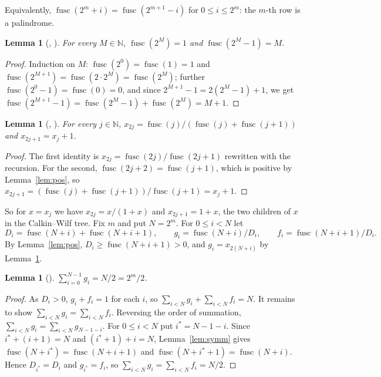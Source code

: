 \documentclass[11pt]{amsart}
\theoremstyle{plain}
\newtheorem{lemma}[theorem]{Lemma}
\theoremstyle{definition}
\newcommand{\N}{\mathbb{N}}
\DeclareMathOperator{\fusc}{fusc}
\begin{document}
Equivalently, $\fusc(2^m+i)=\fusc(2^{m+1}-i)$ for $0\le i\le2^m$: the $m$-th row is a palindrome.

\begin{lemma}[, ]\label{lem:pow}
For every $M\in\N$, $\fusc(2^M)=1$ and $\fusc(2^M-1)=M$.
\end{lemma}

\begin{proof}
Induction on $M$: $\fusc(2^0)=\fusc(1)=1$ and $\fusc(2^{M+1})=\fusc(2\cdot2^M)=\fusc(2^M)$; further $\fusc(2^0-1)=\fusc(0)=0$, and since $2^{M+1}-1=2(2^M-1)+1$, we get $\fusc(2^{M+1}-1)=\fusc(2^M-1)+\fusc(2^M)=M+1$.
\end{proof}

\begin{lemma}[, ]\label{lem:children}
For every $j\in\N$, $x_{2j}=\fusc(j)/(\fusc(j)+\fusc(j+1))$ and $x_{2j+1}=x_j+1$.
\end{lemma}

\begin{proof}
The first identity is $x_{2j}=\fusc(2j)/\fusc(2j+1)$ rewritten with the recursion. For the second, $\fusc(2j+2)=\fusc(j+1)$, which is positive by Lemma~\ref{lem:pos}, so $x_{2j+1}=(\fusc(j)+\fusc(j+1))/\fusc(j+1)=x_j+1$.
\end{proof}

So for $x=x_j$ we have $x_{2j}=x/(1+x)$ and $x_{2j+1}=1+x$, the two children of $x$ in the Calkin--Wilf tree. Fix $m$ and put $N=2^m$. For $0\le i<N$ let
\[
  D_i=\fusc(N+i)+\fusc(N+i+1),\qquad g_i=\fusc(N+i)/D_i,\qquad f_i=\fusc(N+i+1)/D_i .
\]
By Lemma~\ref{lem:pos}, $D_i\ge\fusc(N+i+1)>0$, and $g_i=x_{2(N+i)}$ by Lemma~\ref{lem:children}.

\begin{lemma}[]\label{lem:left}
$\sum_{i=0}^{N-1}g_i=N/2=2^m/2$.
\end{lemma}

\begin{proof}
As $D_i>0$, $g_i+f_i=1$ for each $i$, so $\sum_{i<N}g_i+\sum_{i<N}f_i=N$. It remains to show $\sum_{i<N}g_i=\sum_{i<N}f_i$. Reversing the order of summation, $\sum_{i<N}g_i=\sum_{i<N}g_{N-1-i}$. For $0\le i<N$ put $i^*=N-1-i$. Since $i^*+(i+1)=N$ and $(i^*+1)+i=N$, Lemma~\ref{lem:symm} gives $\fusc(N+i^*)=\fusc(N+i+1)$ and $\fusc(N+i^*+1)=\fusc(N+i)$. Hence $D_{i^*}=D_i$ and $g_{i^*}=f_i$, so $\sum_{i<N}g_i=\sum_{i<N}f_i=N/2$.
\end{proof}
\end{document}
